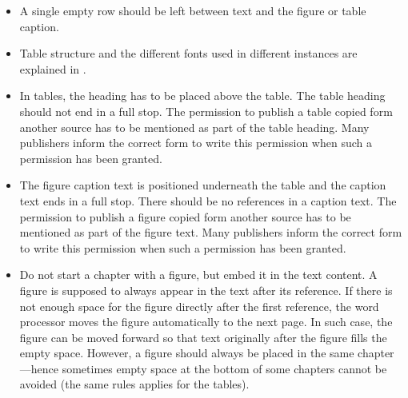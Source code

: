 \begin{itemize}
    \setlength\itemsep{0pt}
    \setlength\parskip{0pt}
    \item A single empty row should be left between text and the figure or table caption. 
    \item Table structure and the different fonts used in different instances are explained in
    .
    \item In tables, the heading has to be placed above the table. The table heading should
    not end in a full stop. The permission to publish a table copied form another
    source has to be mentioned as part of the table heading. Many publishers inform
    the correct form to write this permission when such a permission has been
    granted.
    \item The figure caption text is positioned underneath the table and the caption text ends
    in a full stop. There should be no references in a caption text. The permission to
    publish a figure copied form another source has to be mentioned as part of the
    figure text. Many publishers inform the correct form to write this permission
    when such a permission has been granted.
    \item Do not start a chapter with a figure, but embed it in the text content. A figure is
    supposed to always appear in the text after its reference. If there is not enough
    space for the figure directly after the first reference, the word processor moves the
    figure automatically to the next page. In such case, the figure can be moved 
    forward so that text originally after the figure fills the empty space. However, a
    figure should always be placed in the same chapter---hence sometimes empty
    space at the bottom of some chapters cannot be avoided (the same rules applies for the
    tables).
\end{itemize}

